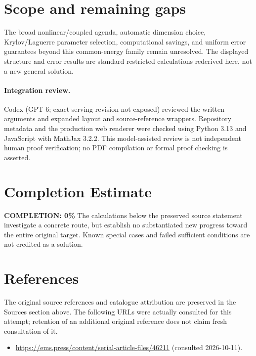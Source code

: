 \documentclass[11pt]{article}
\begin{document}
\section{Scope and remaining gaps}
The broad nonlinear/coupled agenda, automatic dimension choice, Krylov/Laguerre parameter selection, computational savings, and uniform error guarantees beyond this common-energy family remain unresolved. The displayed structure and error results are standard restricted calculations rederived here, not a new general solution.
\paragraph{Integration review.} Codex (GPT-6; exact serving revision not exposed) reviewed the written arguments and expanded layout and source-reference wrappers. Repository metadata and the production web renderer were checked using Python 3.13 and JavaScript with MathJax 3.2.2. This model-assisted review is not independent human proof verification; no PDF compilation or formal proof checking is asserted.

\section{Completion Estimate}
\noindent\textbf{COMPLETION: 0\%}
The calculations below the preserved source statement investigate a concrete route,
but establish no substantiated new progress toward the entire original target.
Known special cases and failed sufficient conditions are not credited as a solution.
\section{References}
The original source references and catalogue attribution are preserved in the
Sources section above. The following URLs were actually consulted for this attempt;
retention of an additional original reference does not claim fresh consultation of it.
\begin{itemize}
\item \url{https://ems.press/content/serial-article-files/46211} (consulted 2026-10-11). 
\end{itemize}
\end{document}
